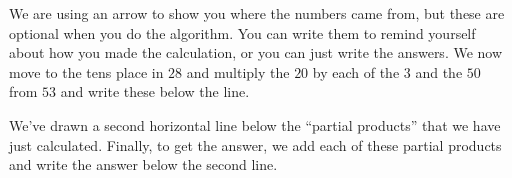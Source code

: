 \documentclass{ximera}
\begin{document}
We are using an arrow to show you where the numbers came from, but these are optional when you do the algorithm. You can write them to remind yourself about how you made the calculation, or you can just write the answers. We now move to the tens place in $28$ and multiply the $20$ by each of the $3$ and the $50$ from $53$ and write these below the line.

\begin{center}
\end{center}

We've drawn a second horizontal line below the ``partial products'' that we have just calculated. Finally, to get the answer, we add each of these partial products and write the answer below the second line. 
\end{document}
